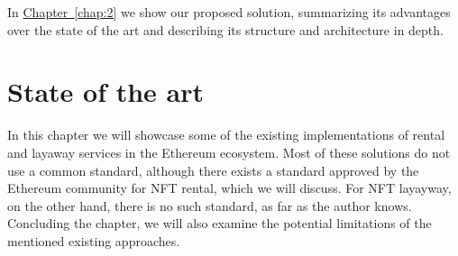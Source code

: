 \documentclass[english, LaM, oneside]{sapthesis}%
\begin{document}
\bigskip
In \hyperref[chap:2]{Chapter~\ref*{chap:2}} we show our proposed solution, summarizing its advantages over the state of the art and describing its structure and architecture in depth.

\chapter{State of the art}
\label{chap:1} 
In this chapter we will showcase some of the existing implementations of rental and layaway services in the Ethereum ecosystem. Most of these solutions do not use a common standard, although there exists a standard approved by the Ethereum community for NFT rental, which we will discuss. For NFT layayway, on the other hand, there is no such standard, as far as the author knows.\newline
Concluding the chapter, we will also examine the potential limitations of the mentioned existing approaches.
\end{document}
